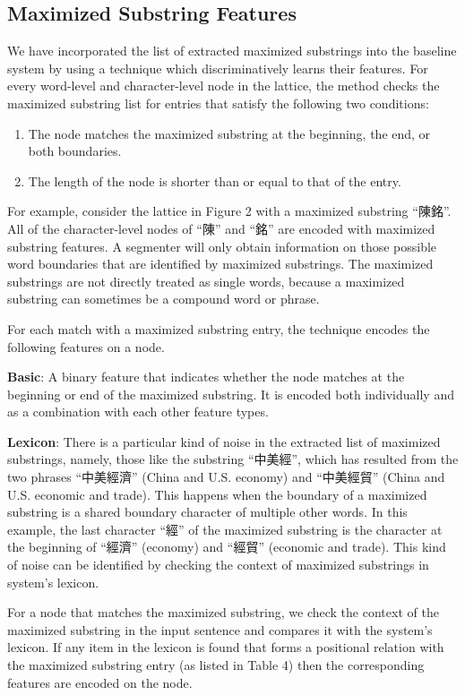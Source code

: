 \documentclass[english]{jnlp_1.4}
\begin{document}
\subsection{Maximized Substring Features}

We have incorporated the list of extracted maximized substrings into the baseline system by using a technique which discriminatively learns their features. For every word-level and character-level node in the lattice, the method checks the maximized substring list for entries that satisfy the following two conditions: 

\begin{enumerate}
\item The node matches the maximized substring at the beginning, the end, or both boundaries.
\item The length of the node is shorter than or equal to that of the entry. 
\end{enumerate}

For example, consider the lattice in Figure 2 with a maximized substring ``陳銘''. All of the character-level nodes of ``陳'' and ``銘'' are encoded with maximized substring features. A segmenter will only obtain information on those possible word boundaries that are identified by maximized substrings. The maximized substrings are not directly treated as single words, because a maximized substring can sometimes be a compound word or phrase.

For each match with a maximized substring entry, the technique encodes the following features on a node.

{\bf Basic}: A binary feature that indicates whether the node matches at the beginning or end of the maximized substring. It is encoded both individually and as a combination with each other feature types.

{\bf Lexicon}: There is a particular kind of noise in the extracted list of maximized substrings, namely, those like the substring ``中美經'', which has resulted from the two phrases ``中美經濟'' (China and U.S. economy) and ``中美經貿'' (China and U.S. economic and trade). This happens when the boundary of a maximized substring is a shared boundary character of multiple other words. In this example, the last character ``經'' of the maximized substring is the character at the beginning of ``經濟'' (economy) and ``經貿'' (economic and trade). This kind of noise can be identified by checking the context of maximized substrings in system's lexicon.


For a node that matches the maximized substring, we check the context of the maximized substring in the input sentence and compares it with the system's lexicon. If any item in the lexicon is found that forms a positional relation with the maximized substring entry (as listed in Table 4) then the corresponding features are encoded on the node. 
\end{document}
